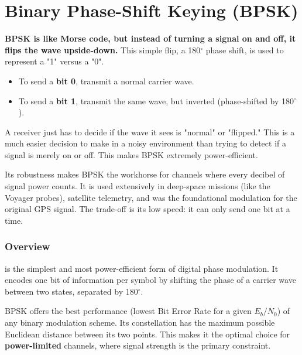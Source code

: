 
\chapter{Binary Phase-Shift Keying (BPSK)}
\label{ch:bpsk}

\begin{nontechnical}
    \textbf{BPSK is like Morse code, but instead of turning a signal on and off, it flips the wave upside-down.} This simple flip, a 180$^\circ$ phase shift, is used to represent a "1" versus a "0".

    \begin{itemize}
        \item To send a \textbf{bit 0}, transmit a normal carrier wave.
        \item To send a \textbf{bit 1}, transmit the same wave, but inverted (phase-shifted by 180$^\circ$).
    \end{itemize}

     A receiver just has to decide if the wave it sees is "normal" or "flipped." This is a much easier decision to make in a noisy environment than trying to detect if a signal is merely on or off. This makes BPSK extremely power-efficient.

     Its robustness makes BPSK the workhorse for  channels where every decibel of signal power counts. It is used extensively in deep-space missions (like the Voyager probes), satellite telemetry, and was the foundational modulation for the original GPS signal. The trade-off is its low speed: it can only send one bit at a time.
\end{nontechnical}


\subsection{Overview}

 is the simplest and most power-efficient form of digital phase modulation. It encodes one bit of information per symbol by shifting the phase of a carrier wave between two states, separated by 180$^\circ$.

\begin{keyconcept}
    BPSK offers the best performance (lowest Bit Error Rate for a given $E_b/N_0$) of any binary modulation scheme. Its constellation has the maximum possible Euclidean distance between its two points. This makes it the optimal choice for \textbf{power-limited} channels, where signal strength is the primary constraint.
\end{keyconcept}



